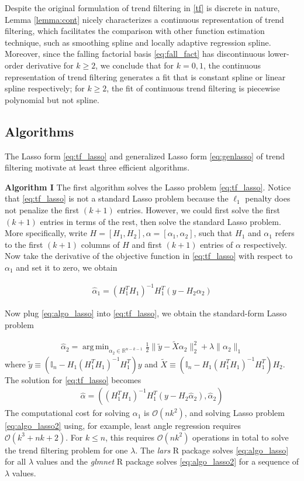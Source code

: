 \documentclass[a4paper]{article}
\DeclareMathOperator*{\argmin}{arg\,min}
\newcommand{\RR}{\mathbb{R}}
\renewcommand{\cal}{\mathcal}
\begin{document}
Despite the original formulation of trend filtering in \eqref{tf} is discrete in nature, Lemma \ref{lemma:cont} nicely characterizes a continuous representation of trend filtering, which facilitates the comparison with other function estimation technique, such as smoothing spline and locally adaptive regression spline. Moreover, since the falling factorial basis \eqref{eq:fall_fact} has discontinuous lower-order derivative for $k\geq 2$, we conclude that for $k = 0,1$, the continuous representation of trend filtering generates a fit that is constant spline or linear spline respectively; for $k\geq 2$, the fit of continuous trend filtering is piecewise polynomial but not spline.

\subsection{Algorithms}
\label{subsec:algo}
The Lasso form \eqref{eq:tf_lasso} and generalized Lasso form \eqref{eq:genlasso} of trend filtering motivate at least three efficient algorithms. 

\textbf{Algorithm I} The first algorithm solves the Lasso problem \eqref{eq:tf_lasso}. Notice that \eqref{eq:tf_lasso} is not a standard Lasso problem because the $\ell_1$ penalty does not penalize the first $(k+1)$ entries. However, we could first solve the first $(k+1)$ entries in terms of the rest, then solve the standard Lasso problem. More specifically, write $H = [H_1,H_2], \alpha = [\alpha_1, \alpha_2]$, such that $H_1$ and $\alpha_1$ refers to the first $(k+1)$ columns of $H$ and first $(k+1)$ entries of $\alpha$ respectively. Now take the derivative of the objective function in \eqref{eq:tf_lasso} with respect to $\alpha_1$ and set it to zero, we obtain

\begin{align}
\hat{\alpha}_1 = (H_1^TH_1)^{-1}H_1^T(y-H_2\alpha_2) 
\label{eq:algo_lasso}
\end{align}

Now plug \eqref{eq:algo_lasso} into \eqref{eq:tf_lasso}, we obtain the standard-form Lasso problem

\begin{align}
\hat{\alpha}_2 = \argmin_{\alpha_2\in\RR^{n-k-1}} \frac{1}{2}\|\tilde{y} - \tilde{X}\alpha_2\|_2^2 + \lambda\|\alpha_2\|_1
\label{eq:algo_lasso2}
\end{align}
where $\tilde{y} \equiv (\mathbb{I}_n - H_1(H_1^TH_1)^{-1}H_1^T)y$ and $\tilde{X} \equiv (\mathbb{I}_n - H_1(H_1^TH_1)^{-1}H_1^T)H_2$. The solution for \eqref{eq:tf_lasso} becomes 
\begin{align}
\hat{\alpha} = ((H_1^TH_1)^{-1}H_1^T(y-H_2\hat{\alpha}_2), \hat{\alpha}_2)
\end{align}
The computational cost for solving $\alpha_1$ is $\cal{O}(nk^2)$, and solving Lasso problem \eqref{eq:algo_lasso2} using, for example, least angle regression\cite{efron2004least} requires $\cal{O}(k^3 + nk+2)$. For $k\leq n$, this requires $\cal{O}(nk^2)$ operations in total to solve the trend filtering problem for one $\lambda$. The \textit{lars} R package solves \eqref{eq:algo_lasso} for all $\lambda$ values and the \textit{glmnet} R package solves \eqref{eq:algo_lasso2} for a sequence of $\lambda$ values.
\end{document}
